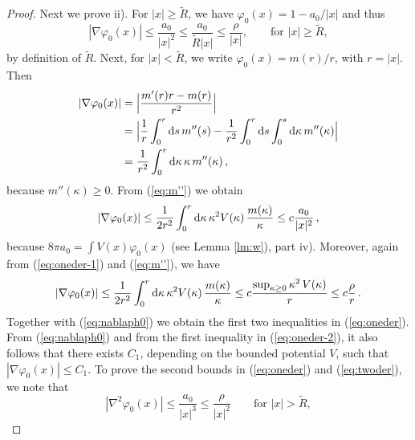 \documentclass[11pt]{article}
\newcommand{\rd}{{\rm d}}
\newcommand{\ph}{\varphi}
\newcommand{\wt}{\widetilde}
\begin{document}
\begin{proof}
Next we prove ii). For $|x| \geq \wt R$, we have $\ph_0 (x) = 1
-a_0/|x|$ and thus
\begin{equation}\label{eq:nablaph0}
|\nabla \ph_0 (x)| \leq \frac{a_0}{|x|^2} \leq \frac{a_0}{{\wt
R}|x|} \leq \frac{\rho}{|x|}, \qquad \text{for } |x| \geq \wt R,
\end{equation}
by definition of $\wt R$. Next, for $|x| < \wt R$, we write $\ph_0
(x) = m(r)/r$, with $r = |x|$. Then
\begin{equation}\label{eq:oneder-1}
\begin{split}
|\nabla \ph_0 (x)| &= \Big| \frac{m'(r)r -m(r)}{r^2}\Big| \\ &=
\Big| \frac{1}{r} \int_0^r \rd s \, m'' (s) - \frac{1}{r^2} \int_0^r
\rd s \int_0^s \rd \kappa \, m''(\kappa) \Big| \\ &= \frac{1}{r^2}
\int_0^r \rd \kappa \, \kappa \, m''(\kappa)\,,
\end{split}
\end{equation}
because $m'' (\kappa) \geq 0$. {F}rom (\ref{eq:m''}) we obtain
\begin{equation}
\begin{split}
|\nabla \ph_0 (x)| \leq \frac{1}{2r^2} \int_0^r \rd \kappa \,
\kappa^2 V (\kappa) \, \frac{m (\kappa)}{\kappa} \leq
c\frac{a_0}{|x|^2} \,,
\end{split}
\end{equation}
because $8\pi a_0 = \int V(x) \ph_0(x)$ (see Lemma \ref{lm:w}), part
iv). Moreover, again from (\ref{eq:oneder-1}) and (\ref{eq:m''}), we
have
\begin{equation}\label{eq:oneder-2}
\begin{split}
|\nabla \ph_0 (x)| \leq \frac{1}{2r^2} \int_0^r \rd \kappa \,
\kappa^2 V (\kappa) \, \frac{m (\kappa)}{\kappa} \leq c
\frac{\sup_{\kappa \geq 0} \kappa^2 \, V(\kappa)}{r} \leq c
\frac{\rho}{r}\, .
\end{split}
\end{equation}
Together with (\ref{eq:nablaph0}) we obtain the first two
inequalities in (\ref{eq:oneder}). {F}rom (\ref{eq:nablaph0}) and
from the first inequality in (\ref{eq:oneder-2}), it also follows
that there exists $C_1$, depending on the bounded potential $V$,
such that $|\nabla \ph_0 (x)| \leq C_1$. To prove the second bounds
in (\ref{eq:oneder}) and (\ref{eq:twoder}), we note that
\begin{equation}\label{eq:twoder-2}
|\nabla^2 \ph_0 (x)| \leq \frac{a_0}{|x|^3} \leq \frac{\rho}{|x|^2}
\qquad\text{for } |x| >{\wt R},
\end{equation}

\end{proof}
\end{document}
